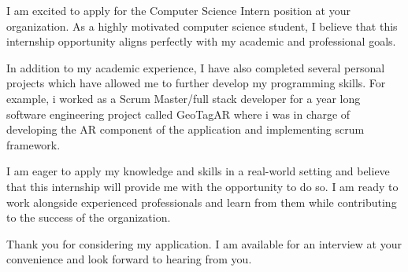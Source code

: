 I am excited to apply for the Computer Science Intern position at your organization.
As a highly motivated computer science student, I believe that this internship 
opportunity aligns perfectly with my academic and professional goals.


In addition to my academic experience, I have also completed several personal projects 
which have allowed me to further develop my programming skills. For example, i worked
as a Scrum Master/full stack developer for a year long software engineering project called GeoTagAR
where i was in charge of developing the AR component of the application and implementing 
scrum framework.

I am eager to apply my knowledge and skills in a real-world setting and believe that 
this internship will provide me with the opportunity to do so. 
I am ready to work alongside experienced professionals and learn from them while 
contributing to the success of the organization.

Thank you for considering my application. I am available for an interview at your 
convenience and look forward to hearing from you.
